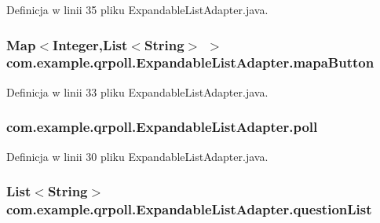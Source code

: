 Definicja w linii 35 pliku Expandable\+List\+Adapter.\+java.

\hypertarget{classcom_1_1example_1_1qrpoll_1_1_expandable_list_adapter_a8351d33fae079b02fb540090d49c6f2e}{
\subsubsection[{mapa\+Button}]{\setlength{\rightskip}{0pt plus 5cm}Map$<$Integer,List$<$String$>$ $>$ com.\+example.\+qrpoll.\+Expandable\+List\+Adapter.\+mapa\+Button\hspace{0.3cm}{\ttfamily [private]}}}\label{classcom_1_1example_1_1qrpoll_1_1_expandable_list_adapter_a8351d33fae079b02fb540090d49c6f2e}


Definicja w linii 33 pliku Expandable\+List\+Adapter.\+java.

\hypertarget{classcom_1_1example_1_1qrpoll_1_1_expandable_list_adapter_a35f2a91149fc7265646cd916c54a02ef}{
\subsubsection[{poll}]{ com.\+example.\+qrpoll.\+Expandable\+List\+Adapter.\+poll\hspace{0.3cm}{\ttfamily [private]}}}\label{classcom_1_1example_1_1qrpoll_1_1_expandable_list_adapter_a35f2a91149fc7265646cd916c54a02ef}


Definicja w linii 30 pliku Expandable\+List\+Adapter.\+java.

\hypertarget{classcom_1_1example_1_1qrpoll_1_1_expandable_list_adapter_a21519cda6be88f0b729afc1ac0cc06a5}{
\subsubsection[{question\+List}]{\setlength{\rightskip}{0pt plus 5cm}List$<$String$>$ com.\+example.\+qrpoll.\+Expandable\+List\+Adapter.\+question\+List\hspace{0.3cm}{\ttfamily [private]}}}\label{classcom_1_1example_1_1qrpoll_1_1_expandable_list_adapter_a21519cda6be88f0b729afc1ac0cc06a5}


